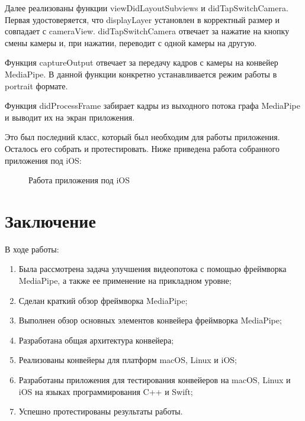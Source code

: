 \documentclass[a4paper,14pt]{extreport}
\begin{document}
        Далее реализованы функции viewDidLayoutSubviews и didTapSwitchCamera. Первая удостоверяется, что displayLayer установлен в корректный размер и совпадает с cameraView. didTapSwitchCamera отвечает за нажатие на кнопку смены камеры и, при нажатии, переводит с одной камеры на другую.
        

        Функция captureOutput отвечает за передачу кадров с камеры на конвейер MediaPipe. В данной функции конкретно устанавливается режим работы в portrait формате.
        
        
        Функция didProcessFrame забирает кадры из выходного потока графа MediaPipe и выводит их на экран приложения.
        

        Это был последний класс, который был необходим для работы приложения. Осталось его собрать и протестировать. Ниже приведена работа собранного приложения под iOS:
        \begin{figure}[h]
            \caption{Работа приложения под iOS}
            \label{ris:subgraph}
        \end{figure}

    \chapter*{Заключение}
    В ходе работы:
    \begin{enumerate}
        \item Была рассмотрена задача улучшения видеопотока с помощью фреймворка MediaPipe, а также ее применение на прикладном уровне;
        \item Сделан краткий обзор фреймворка MediaPipe;
        \item Выполнен обзор основных элементов конвейера фреймворка MediaPipe;
        \item Разработана общая архитектура конвейера;
        \item Реализованы конвейеры для платформ macOS, Linux и iOS;
        \item Разработаны приложения для тестирования конвейеров на macOS, Linux и iOS на языках программирования C++ и Swift;
        \item Успешно протестированы результаты работы.
    \end{enumerate}
\end{document}
